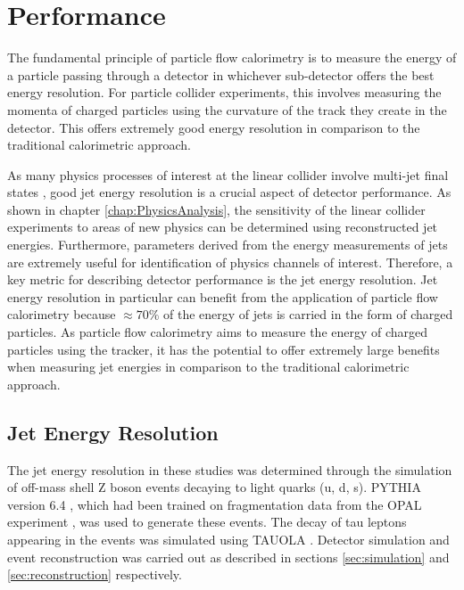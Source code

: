 
\section{Performance}
\label{sec:performance}
The fundamental principle of particle flow calorimetry is to measure the energy of a particle passing through a detector in whichever sub-detector offers the best energy resolution.  For particle collider experiments, this involves measuring the momenta of charged particles using the curvature of the track they create in the detector.  This offers extremely good energy resolution in comparison to the traditional calorimetric approach.  

As many physics processes of interest at the linear collider involve multi-jet final states \cite{Abramowicz:2016zbo}, good jet energy resolution is a crucial aspect of detector performance.    As shown in chapter \ref{chap:PhysicsAnalysis}, the sensitivity of the linear collider experiments to areas of new physics can be determined using reconstructed jet energies.  Furthermore, parameters derived from the energy measurements of jets are extremely useful for identification of physics channels of interest.  Therefore, a key metric for describing detector performance is the jet energy resolution.  Jet energy resolution in particular can benefit from the application of particle flow calorimetry because $\approx 70 \%$ of the energy of jets is carried in the form of charged particles.  As particle flow calorimetry aims to measure the energy of charged particles using the tracker, it has the potential to offer extremely large benefits when measuring jet energies in comparison to the traditional calorimetric approach.  


\subsection{Jet Energy Resolution}
The jet energy resolution in these studies was determined through the simulation of off-mass shell Z boson events decaying to light quarks (u, d, s).  PYTHIA version 6.4 \cite{Sjostrand:2006za}, which had been trained on fragmentation data from the OPAL experiment \cite{Alexander:1995bk}, was used to generate these events.  The decay of tau leptons appearing in the events was simulated using TAUOLA \cite{Was:2000st}.  Detector simulation and event reconstruction was carried out as described in sections \ref{sec:simulation} and \ref{sec:reconstruction} respectively.  

